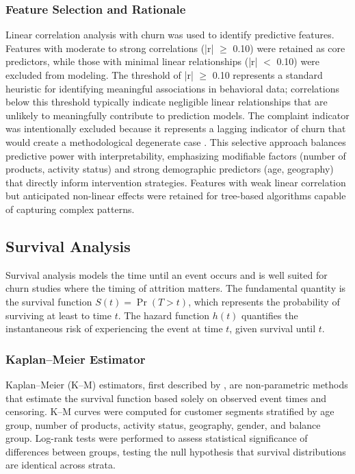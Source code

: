 \documentclass[12pt]{article}
\begin{document}
\subsubsection{Feature Selection and Rationale}
Linear correlation analysis with churn was used to identify predictive features. Features with moderate to strong correlations (|r| $\geq$ 0.10) were retained as core predictors, while those with minimal linear relationships (|r| $<$ 0.10) were excluded from modeling. The threshold of |r| $\geq$ 0.10 represents a standard heuristic for identifying meaningful associations in behavioral data; correlations below this threshold typically indicate negligible linear relationships that are unlikely to meaningfully contribute to prediction models. The complaint indicator was intentionally excluded because it represents a lagging indicator of churn that would create a methodological degenerate case \citep{kumar2022customerretention}. This selective approach balances predictive power with interpretability, emphasizing modifiable factors (number of products, activity status) and strong demographic predictors (age, geography) that directly inform intervention strategies. Features with weak linear correlation but anticipated non-linear effects were retained for tree-based algorithms capable of capturing complex patterns.


\subsection{Survival Analysis}
Survival analysis models the time until an event occurs and is well suited for churn studies where the timing of attrition matters. The fundamental quantity is the survival function \(S(t) = \Pr(T > t)\), which represents the probability of surviving at least to time \(t\). The hazard function \(h(t)\) quantifies the instantaneous risk of experiencing the event at time \(t\), given survival until \(t\).

\subsubsection{Kaplan–Meier Estimator}
Kaplan–Meier (K–M) estimators, first described by \citet{dudley2016kaplan}, are non‑parametric methods that estimate the survival function based solely on observed event times and censoring. K–M curves were computed for customer segments stratified by age group, number of products, activity status, geography, gender, and balance group. Log-rank tests were performed to assess statistical significance of differences between groups, testing the null hypothesis that survival distributions are identical across strata.
\end{document}
